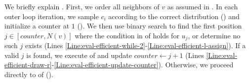We briefly explain . First, we order all neighbors of $v$ as assumed in . In each outer loop iteration, we sample  $c_i$ according to the correct distribution () and initialize a counter at $1$ (). We then use binary search to find the first position $j\in [counter,N(v)]$ where the condition in  of  holds for $u_j$, or determine no such $j$ exists (Lines \ref{Line:eval-efficient-while-2}-\ref{Line:eval-efficient-l-assign}).  If a valid $j$ is found, we execute  of  and update $counter\gets j+1$ (Lines \ref{Line:eval-efficient-draw-r}-\ref{Line:eval-efficient-update-counter}). Otherwise, we proceed directly to  of  ().

\begin{comment}
To actually perform the binary search,  
\begin{itemize}
    \item we initialize the interval $[l,r]=[counter,N(v)]$ (\Cref{Line:eval-efficient-initialize-bs}) and sample $\textrm{ind}_{l,r}\sim \textrm{Bern}1-\lb^{r-l+1}$ as the indicator variable of whether there exists some $j\in [l,r]$ such that $r_{i,u_j}\geq \lb$ (\Cref{Line:eval-efficient-sample-initial}).  Note that this $1-\lb^{r-l+1}$ is exactly the probability at least one such $j$ exists in $[l,r]$, assuming  $\{(c_i,(r_{i,u})_{u\in N(v)})\}_{1\leq i<\infty}$ is an infinite long i.i.d sequence where
    each $c_i\in [q]$ is distributed as $\lambda_v$ and each $r_{i,u}$ is chosen uniformly from $[0,1]$. 
    \item At each step of the binary search, we maintain the invariant that if our current interval is $[l,r]$, then there exists at least one $j\in [l,r]$  such that $r_{i,u_j}\geq \lb$. We then choose $mid=\left\lfloor\frac{l+r}{2}\right\rfloor$ (\Cref{Line:eval-efficient-set-mid}) and try to narrow down the search interval to either $[l,mid]$ or $[mid+1]$. To do this, we check if at least one such $j\in [l,mid]$ exists through sampling an indicator variable $\textrm{ind}_{l,mid}\sim\textrm{Bern}\left(\frac{\lb^{mid-l+1}}{\lb^{r-l+1}}\right)$ (\Cref{Line:eval-efficient-sample-mid}). Note that this indicator variable is drawn according to the probability that there exists at least one $j\in [l,mid]$  such that $r_{i,u_j}\geq \lb$ conditioning on such  there exists at least one such $j\in [l,r]$, assuming  $\{(c_i,(r_{i,u})_{u\in N(v)})\}_{1\leq i<\infty}$ is an infinite long i.i.d sequence where
    each $c_i\in [q]$ is distributed as $\lambda_v$ and each $r_{u,j}$ is chosen uniformly from $[0,1]$. 
\end{itemize}
\end{comment}

